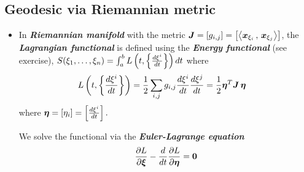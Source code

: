 \documentclass[11pt]{article}
\begin{document}
\subsection{Geodesic via Riemannian metric}
\begin{itemize}
\item  In \emph{\textbf{Riemannian manifold}} with the metric $\boldsymbol{J} = [g_{i,j}]= \left[\left\langle \boldsymbol{x}_{\xi_{i}}\,,\, \boldsymbol{x}_{\xi_{j}} \right\rangle\right]$, the \emph{\textbf{Lagrangian functional}} is defined using the \emph{\textbf{Energy functional}} (see exercise), $S(\xi_{1},\ldots, \xi_{n}) = \int_{a}^{b}L\left(t, \left\{\frac{d\xi^{i}}{dt}\right\}\right) dt$ where
\begin{align*}
L\left(t, \left\{\frac{d\xi^{i}}{dt}\right\}\right) &= \frac{1}{2}\sum_{i,j}g_{i,j}\frac{d\xi^{i}}{dt}\frac{d\xi^{j}}{dt} = \frac{1}{2}\boldsymbol{\eta}^{T}\boldsymbol{J}\,\boldsymbol{\eta}
\end{align*}  where $\boldsymbol{\eta} = [\eta_{i}] = \left[\frac{d\xi^{i}}{dt}\right].$

We solve the functional via the \emph{\textbf{Euler-Lagrange equation}}
\begin{align*}
\frac{\partial L}{ \partial \boldsymbol{\xi}} - \frac{d}{dt}\frac{\partial L}{ \partial \boldsymbol{\eta}}  = \boldsymbol{0}
\end{align*}


\end{itemize}
\end{document}
